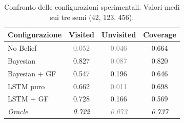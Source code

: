 \begin{table}[ht]
\centering
\caption{Confronto delle configurazioni sperimentali. Valori medi sui tre semi (42, 123, 456).}
\label{tab:results_summary}
\begin{tabular}{lccc}
\toprule
\textbf{Configurazione} & \textbf{Visited} & \textbf{Unvisited} & \textbf{Coverage} \\
\midrule
No Belief & \textcolor{gray}{0.052} & \textcolor{gray}{0.046} & 0.664 \\
Bayesian & 0.827 & \textcolor{gray}{0.087} & 0.820 \\
Bayesian + GF & 0.547 & 0.196 & 0.646 \\
LSTM puro & 0.662 & \textcolor{gray}{0.011} & 0.698 \\
LSTM + GF & 0.728 & 0.166 & 0.569 \\
\midrule
\textit{Oracle} & \textit{0.722} & \textit{\textcolor{gray}{0.073}} & \textit{0.737} \\
\bottomrule
\end{tabular}
\end{table}